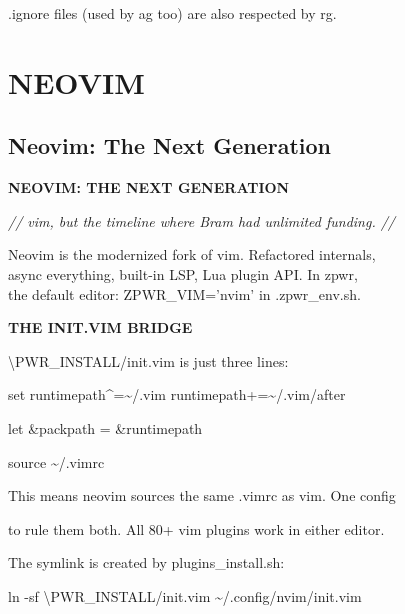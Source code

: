 \documentclass[11pt,a4paper,twoside]{book}
\begin{document}
.ignore files (used by ag too) are also respected by rg.


\vspace{16pt}


\chapter{NEOVIM}

\section{Neovim: The Next Generation}


\vspace{10pt}
{\large\bfseries\color{neoncyan} NEOVIM: THE NEXT GENERATION}\vspace{6pt}

{\small\itshape\color{dimtext} // vim, but the timeline where Bram had unlimited funding. //}

\begin{codebox}
Neovim is the modernized fork of vim. Refactored internals,\\
async everything, built-in LSP, Lua plugin API. In zpwr,\\
the default editor: ZPWR\_VIM='nvim' in .zpwr\_env.sh.\\
\end{codebox}


\vspace{12pt}
{\bfseries\color{neonyellow} THE INIT.VIM BRIDGE}\vspace{4pt}

\textbackslash{}PWR\_INSTALL/init.vim is just three lines:

\begin{codebox}
set runtimepath\textasciicircum{}=\textasciitilde{}/.vim runtimepath+=\textasciitilde{}/.vim/after\\
\end{codebox}

let \&packpath = \&runtimepath

source \textasciitilde{}/.vimrc

This means neovim sources the same .vimrc as vim. One config

to rule them both. All 80+ vim plugins work in either editor.

The symlink is created by plugins\_install.sh:

\begin{codebox}
ln -sf \textbackslash{}PWR\_INSTALL/init.vim \textasciitilde{}/.config/nvim/init.vim\\
\end{codebox}
\end{document}
